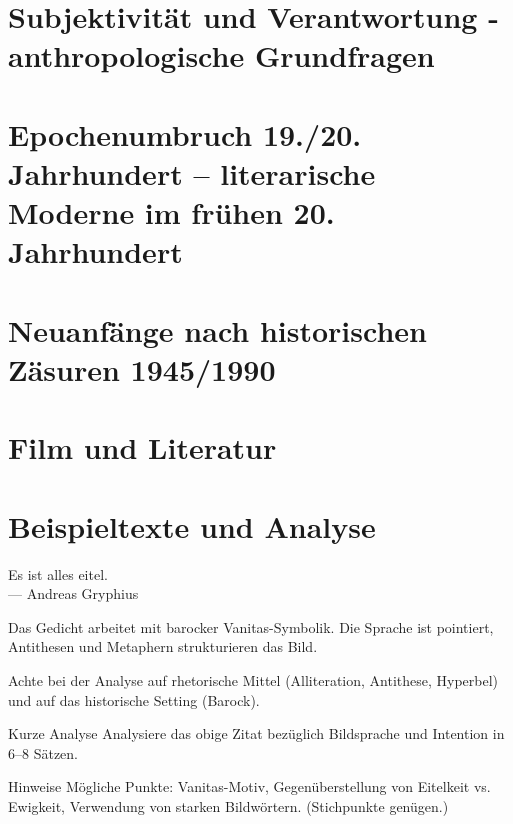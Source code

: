 \documentclass[11pt,a4paper,oneside]{article}
\begin{document}
	
	\newpage
	
	
	\section{Subjektivität und Verantwortung - anthropologische Grundfragen}
	\section{Epochenumbruch 19./20. Jahrhundert – literarische Moderne im frühen 20. Jahrhundert}
	\section{Neuanfänge nach historischen Zäsuren 1945/1990}
	\section{Film und Literatur}
	
	\newpage
	
	\section{Beispieltexte und Analyse}
	
	\begin{zitat}
		Es ist alles eitel. \\
		— Andreas Gryphius
	\end{zitat}
	
	\begin{interpret}
		Das Gedicht arbeitet mit barocker Vanitas-Symbolik. Die Sprache ist pointiert, Antithesen und Metaphern strukturieren das Bild.
	\end{interpret}
	
	\begin{hinweis}
		Achte bei der Analyse auf rhetorische Mittel (Alliteration, Antithese, Hyperbel) und auf das historische Setting (Barock).
	\end{hinweis}
	
	\begin{aufgabe}{Kurze Analyse}
		Analysiere das obige Zitat bezüglich Bildsprache und Intention in 6–8 Sätzen.
	\end{aufgabe}
	
	\begin{loesung}{Hinweise}
		Mögliche Punkte: Vanitas-Motiv, Gegenüberstellung von Eitelkeit vs. Ewigkeit, Verwendung von starken Bildwörtern. (Stichpunkte genügen.)
	\end{loesung}
	
\end{document}
